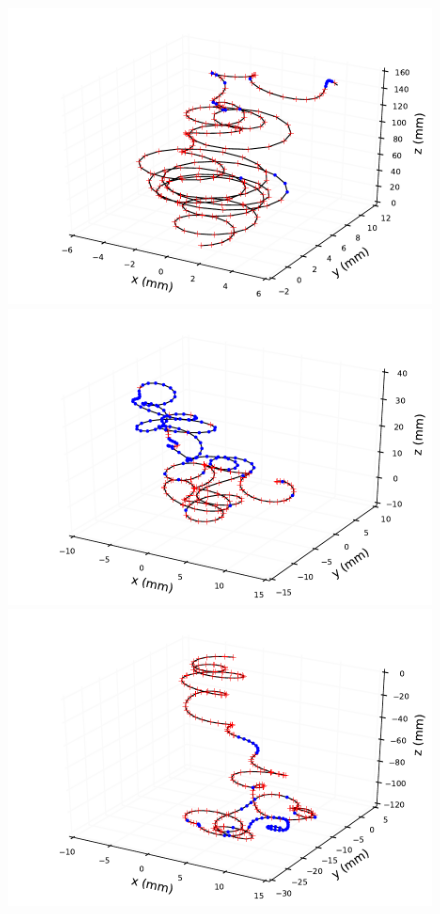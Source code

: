 \documentclass{JINST}
\begin{document}
\begin{figure}[!htb]
	\includegraphics[scale=0.48]{fig/plt_trkcurv_magse05_ms13pt6_0.pdf}
	\includegraphics[scale=0.48]{fig/plt_trkcurv_magbb05_ms13pt6_2.pdf}
	\includegraphics[scale=0.48]{fig/plt_trkcurv_magse05_ms27pt2_0.pdf}

\end{figure}
\end{document}
